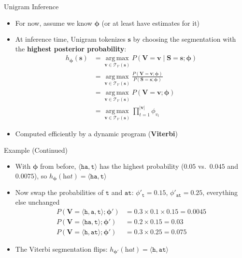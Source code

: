 \documentclass[11pt,compress,t,notes=noshow, xcolor=table]{beamer}
\newcommand{\vocab}{\mathcal{V}}
\newcommand{\probs}{\boldsymbol{\phi}}
\begin{document}
\begin{frame}{Unigram Inference}

\vfill

\begin{itemize}
\item For now, assume we know $\probs$ (or at least have estimates for it)
\item At inference time, Unigram tokenizes $\mathbf{s}$ by choosing the segmentation with the \textbf{highest posterior probability}:
\begin{align*}
h_{\probs}(\mathbf{s}) &= \operatorname*{arg\,max}_{\mathbf{v} \in \mathcal{T}_{\vocab}(\mathbf{s})} P(\mathbf{V} = \mathbf{v} \mid \mathbf{S} = \mathbf{s}; \probs)\\
&= \operatorname*{arg\,max}_{\mathbf{v} \in \mathcal{T}_{\vocab}(\mathbf{s})} \frac{P(\mathbf{V} = \mathbf{v}; \probs)}{P(\mathbf{S} = \mathbf{s}; \probs)}\\
&= \operatorname*{arg\,max}_{\mathbf{v} \in \mathcal{T}_{\vocab}(\mathbf{s})} P(\mathbf{V} = \mathbf{v}; \probs)\\
&= \operatorname*{arg\,max}_{\mathbf{v} \in \mathcal{T}_{\vocab}(\mathbf{s})} \prod_{t=1}^{|\mathbf{v}|} \phi_{v_t}
\end{align*}
\item Computed efficiently by a dynamic program (\textbf{Viterbi})
\end{itemize}

\vfill

\end{frame}


\begin{frame}{Example (Continued)}

\vfill

\begin{itemize}
\item With $\probs$ from before, $\langle \texttt{ha}, \texttt{t} \rangle$ has the highest probability ($0.05$ vs.\ $0.045$ and $0.0075$), so $h_{\probs}(\textit{hat}) = \langle \texttt{ha}, \texttt{t} \rangle$
\item Now swap the probabilities of $\texttt{t}$ and $\texttt{at}$: $\phi'_{\texttt{t}} = 0.15$, $\phi'_{\texttt{at}} = 0.25$, everything else unchanged
\begin{align*}
P(\mathbf{V} = \langle \texttt{h}, \texttt{a}, \texttt{t} \rangle; \probs') &= 0.3 \times 0.1 \times 0.15 = 0.0045\\
P(\mathbf{V} = \langle \texttt{ha}, \texttt{t} \rangle; \probs') &= 0.2 \times 0.15 = 0.03\\
P(\mathbf{V} = \langle \texttt{h}, \texttt{at} \rangle; \probs') &= 0.3 \times 0.25 = 0.075
\end{align*}
\item The Viterbi segmentation flips: $h_{\probs'}(\textit{hat}) = \langle \texttt{h}, \texttt{at} \rangle$
\end{itemize}

\vfill

\end{frame}
\end{document}
